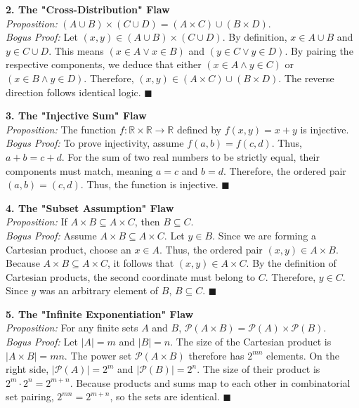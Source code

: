 \documentclass[12pt]{article}
\theoremstyle{definition}
\theoremstyle{remark}
\begin{document}
\textbf{2. The "Cross-Distribution" Flaw} \\
\textit{Proposition:} $(A \cup B) \times (C \cup D) = (A \times C) \cup (B \times D)$. \\
\textit{Bogus Proof:} Let $(x,y) \in (A \cup B) \times (C \cup D)$. By definition, $x \in A \cup B$ and $y \in C \cup D$. This means $(x \in A \lor x \in B)$ and $(y \in C \lor y \in D)$. By pairing the respective components, we deduce that either $(x \in A \land y \in C)$ or $(x \in B \land y \in D)$. Therefore, $(x, y) \in (A \times C) \cup (B \times D)$. The reverse direction follows identical logic. $\blacksquare$

\textbf{3. The "Injective Sum" Flaw} \\
\textit{Proposition:} The function $f: \mathbb{R} \times \mathbb{R} \to \mathbb{R}$ defined by $f(x, y) = x + y$ is injective. \\
\textit{Bogus Proof:} To prove injectivity, assume $f(a, b) = f(c, d)$. Thus, $a + b = c + d$. For the sum of two real numbers to be strictly equal, their components must match, meaning $a = c$ and $b = d$. Therefore, the ordered pair $(a, b) = (c, d)$. Thus, the function is injective. $\blacksquare$

\textbf{4. The "Subset Assumption" Flaw} \\
\textit{Proposition:} If $A \times B \subseteq A \times C$, then $B \subseteq C$. \\
\textit{Bogus Proof:} Assume $A \times B \subseteq A \times C$. Let $y \in B$. Since we are forming a Cartesian product, choose an $x \in A$. Thus, the ordered pair $(x, y) \in A \times B$. Because $A \times B \subseteq A \times C$, it follows that $(x, y) \in A \times C$. By the definition of Cartesian products, the second coordinate must belong to $C$. Therefore, $y \in C$. Since $y$ was an arbitrary element of $B$, $B \subseteq C$. $\blacksquare$

\textbf{5. The "Infinite Exponentiation" Flaw} \\
\textit{Proposition:} For any finite sets $A$ and $B$, $\mathcal{P}(A \times B) = \mathcal{P}(A) \times \mathcal{P}(B)$. \\
\textit{Bogus Proof:} Let $|A| = m$ and $|B| = n$. The size of the Cartesian product is $|A \times B| = mn$. The power set $\mathcal{P}(A \times B)$ therefore has $2^{mn}$ elements. On the right side, $|\mathcal{P}(A)| = 2^m$ and $|\mathcal{P}(B)| = 2^n$. The size of their product is $2^m \cdot 2^n = 2^{m+n}$. Because products and sums map to each other in combinatorial set pairing, $2^{mn} = 2^{m+n}$, so the sets are identical. $\blacksquare$
\end{document}
